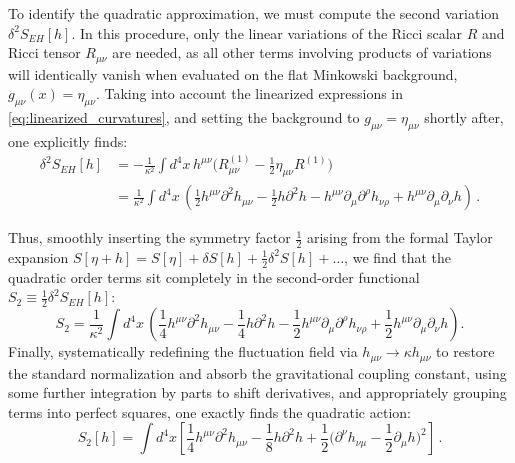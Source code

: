 To identify the quadratic approximation, we must compute the second variation \(\delta^2 S_{EH}[h]\). In this procedure, only the linear variations of the Ricci scalar \(R\) and Ricci tensor \(R_{\mu\nu}\) are needed, as all other terms involving products of variations will identically vanish when evaluated on the flat Minkowski background, \(g_{\mu\nu}(x) = \eta_{\mu\nu}\). Taking into account the linearized expressions in \ref{eq:linearized_curvatures}, and setting the background to \(g_{\mu\nu} = \eta_{\mu\nu}\) shortly after, one explicitly finds:
\[
    \begin{aligned}
        \delta^2 S_{EH}[h] & = - \frac{1}{\kappa^2} \int d^4x \, h^{\mu\nu} \Big( R^{(1)}_{\mu\nu} - \frac{1}{2} \eta_{\mu\nu} R^{(1)} \Big)                                                                                                              \\
                           & = \frac{1}{\kappa^2} \int d^4x \, \left( \frac{1}{2} h^{\mu\nu} \partial^2 h_{\mu\nu} - \frac{1}{2} h \partial^2 h - h^{\mu\nu} \partial_\mu \partial^\rho h_{\nu\rho} + h^{\mu\nu} \partial_\mu \partial_\nu h \right) \, .
    \end{aligned}
\]

Thus, smoothly inserting the symmetry factor \(\frac{1}{2}\) arising from the formal Taylor expansion \(S[\eta + h] = S[\eta] + \delta S[h] + \frac{1}{2} \delta^2 S[h] + \dots\), we find that the quadratic order terms sit completely in the second-order functional \(S_2 \equiv \frac{1}{2} \delta^2 S_{EH}[h]\):
\[
    S_2 = \frac{1}{\kappa^2} \int d^4x \, \left( \frac{1}{4} h^{\mu\nu} \partial^2 h_{\mu\nu} - \frac{1}{4} h \partial^2 h - \frac{1}{2} h^{\mu\nu} \partial_\mu \partial^\rho h_{\nu\rho} + \frac{1}{2} h^{\mu\nu} \partial_\mu \partial_\nu h \right).
\]
Finally, systematically redefining the fluctuation field via \(h_{\mu\nu} \to \kappa h_{\mu\nu}\) to restore the standard normalization and absorb the gravitational coupling constant, using some further integration by parts to shift derivatives, and appropriately grouping terms into perfect squares, one exactly finds the quadratic action:
\begin{equation} \label{eq:s2_final}
    S_2[h] = \int d^4x \left[ \frac{1}{4} h^{\mu\nu} \partial^2 h_{\mu\nu} - \frac{1}{8} h \partial^2 h + \frac{1}{2} \Big( \partial^\nu h_{\nu\mu} - \frac{1}{2} \partial_\mu h \Big)^2 \right] \, .
\end{equation}